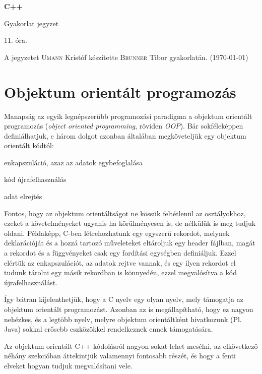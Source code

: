 \documentclass[a4paper,11.5pt,table]{article}
\begin{document}
	\setlength\parindent{0pt}
	\def\<{<\hspace{0mm}<}
	
	\theoremstyle{definition}
	\newtheorem{note}{Megjegyzés}[subsection]
	
	\begin{center}
		{\LARGE\textbf{C++}}
		
		{\Large Gyakorlat jegyzet}
		
		11. óra.
	\end{center}
	A jegyzetet \textsc{Umann} Kristóf készítette \textsc{Brunner} Tibor gyakorlatán. (\today)
	\section{Objektum orientált programozás}
	Manapság az egyik legnépszerűbb programozási paradigma a objektum orientált programozás (\textit{object oriented programming}, röviden \textit{OOP}). Bár sokféleképpen definiálhatjuk, e három dolgot azonban általában megköveteljük egy objektum orientált kódtól:
	\begin{compactitem}
		\item enkapszuláció, azaz az adatok egybefoglalása
		\item kód újrafelhasználás
		\item adat elrejtés
	\end{compactitem}
	Fontos, hogy az objektum orientáltságot ne kössük feltétlenül az osztályokhoz, ezeket a követelményeket ugyanis ha körülményesen is, de nélkülük is meg tudjuk oldani. Példaképp, C-ben létrehozhatunk egy egyszerű rekordot, melynek deklarációját és a hozzá tartozó műveleteket eltároljuk egy header fájlban, magát a rekordot és a függvényeket csak egy fordítási egységben definiáljuk. Ezzel elértük az enkapszulációt, az adatok rejtve vannak, és egy ilyen rekordot el tudunk tárolni egy másik rekordban is könnyedén, ezzel megvalósítva a kód újrafelhasználást.

	Így bátran kijelenthetjük, hogy a C nyelv egy olyan nyelv, mely támogatja az objektum orientált programozást. Azonban az is megállapítható, hogy ez nagyon nehézkes, és a legtöbb nyelv, melyre objektum orientáltként hivatkozunk (Pl. Java) sokkal erősebb eszközökkel rendelkeznek ennek támogatására.
	
	Az objektum orientált C++ kódolásról nagyon sokat lehet mesélni, az elkövetkező néhány szekcióban áttekintjük valamennyi fontosabb részét, és hogy a fenti elveket hogyan tudjuk megvalósítani vele.
\end{document}
